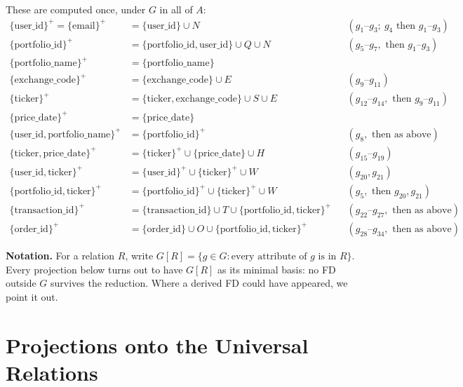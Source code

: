 \documentclass{article}
\newcommand{\at}[1]{\text{#1}}
\newcommand{\cl}[1]{\{#1\}^+}
\newcommand{\gr}[2]{g_{#1}\text{--}g_{#2}}
\begin{document}
These are computed once, under $G$ in all of $A$:
\begin{align*}
  \cl{\at{user\_id}} = \cl{\at{email}} &= \{\at{user\_id}\} \cup N && (\gr{1}{3}; \ g_4 \text{ then } \gr{1}{3}) \\
  \cl{\at{portfolio\_id}} &= \{\at{portfolio\_id}, \at{user\_id}\} \cup Q \cup N && (\gr{5}{7}, \text{ then } \gr{1}{3}) \\
  \cl{\at{portfolio\_name}} &= \{\at{portfolio\_name}\} \\
  \cl{\at{exchange\_code}} &= \{\at{exchange\_code}\} \cup E && (\gr{9}{11}) \\
  \cl{\at{ticker}} &= \{\at{ticker}, \at{exchange\_code}\} \cup S \cup E && (\gr{12}{14}, \text{ then } \gr{9}{11}) \\
  \cl{\at{price\_date}} &= \{\at{price\_date}\} \\
  \cl{\at{user\_id}, \at{portfolio\_name}} &= \cl{\at{portfolio\_id}} && (g_8, \text{ then as above}) \\
  \cl{\at{ticker}, \at{price\_date}} &= \cl{\at{ticker}} \cup \{\at{price\_date}\} \cup H && (\gr{15}{19}) \\
  \cl{\at{user\_id}, \at{ticker}} &= \cl{\at{user\_id}} \cup \cl{\at{ticker}} \cup W && (g_{20}, g_{21}) \\
  \cl{\at{portfolio\_id}, \at{ticker}} &= \cl{\at{portfolio\_id}} \cup \cl{\at{ticker}} \cup W && (g_5, \text{ then } g_{20}, g_{21}) \\
  \cl{\at{transaction\_id}} &= \{\at{transaction\_id}\} \cup T \cup \cl{\at{portfolio\_id}, \at{ticker}} && (\gr{22}{27}, \text{ then as above}) \\
  \cl{\at{order\_id}} &= \{\at{order\_id}\} \cup O \cup \cl{\at{portfolio\_id}, \at{ticker}} && (\gr{28}{34}, \text{ then as above})
\end{align*}

\textbf{Notation.} For a relation $R$, write $G[R] = \{g \in G : \text{every attribute of } g \text{ is in } R\}$. Every projection below turns out to have $G[R]$ as its minimal basis: no FD outside $G$ survives the reduction. Where a derived FD could have appeared, we point it out.

\section{Projections onto the Universal Relations}
\end{document}
